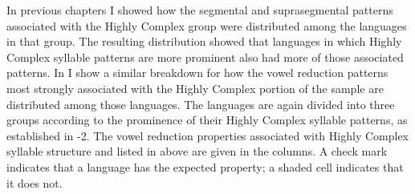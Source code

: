   In previous chapters I showed how the segmental and suprasegmental patterns associated with the Highly Complex group were distributed among the languages in that group. The resulting distribution showed that languages in which Highly Complex syllable patterns are more prominent also had more of those associated patterns. In  I show a similar breakdown for how the vowel reduction patterns most strongly associated with the Highly Complex portion of the sample are distributed among those languages. The languages are again divided into three groups according to the prominence of their Highly Complex syllable patterns, as established in -2. The vowel reduction properties associated with Highly Complex syllable structure and listed in  above are given in the columns. A check mark indicates that a language has the expected property; a shaded cell indicates that it does not. 

